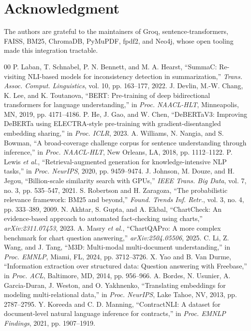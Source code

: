 \documentclass[conference]{IEEEtran}
\begin{document}
\section*{Acknowledgment}
The authors are grateful to the maintainers of Groq, sentence-transformers, FAISS, BM25, ChromaDB, PyMuPDF, fpdf2, and Neo4j, whose open tooling made this integration tractable.
\begin{thebibliography}{00}
P. Laban, T. Schnabel, P. N. Bennett, and M. A. Hearst, ``SummaC: Re-visiting NLI-based models for inconsistency detection in summarization,'' \textit{Trans. Assoc. Comput. Linguistics}, vol. 10, pp. 163--177, 2022.
J. Devlin, M.-W. Chang, K. Lee, and K. Toutanova, ``BERT: Pre-training of deep bidirectional transformers for language understanding,'' in \textit{Proc. NAACL-HLT}, Minneapolis, MN, 2019, pp. 4171--4186.
P. He, J. Gao, and W. Chen, ``DeBERTaV3: Improving DeBERTa using ELECTRA-style pre-training with gradient-disentangled embedding sharing,'' in \textit{Proc. ICLR}, 2023.
A. Williams, N. Nangia, and S. Bowman, ``A broad-coverage challenge corpus for sentence understanding through inference,'' in \textit{Proc. NAACL-HLT}, New Orleans, LA, 2018, pp. 1112--1122.
P. Lewis \textit{et al.}, ``Retrieval-augmented generation for knowledge-intensive NLP tasks,'' in \textit{Proc. NeurIPS}, 2020, pp. 9459--9474.
J. Johnson, M. Douze, and H. Jegou, ``Billion-scale similarity search with GPUs,'' \textit{IEEE Trans. Big Data}, vol. 7, no. 3, pp. 535--547, 2021.
S. Robertson and H. Zaragoza, ``The probabilistic relevance framework: BM25 and beyond,'' \textit{Found. Trends Inf. Retr.}, vol. 3, no. 4, pp. 333--389, 2009.
N. Akhtar, S. Gupta, and A. Ekbal, ``ChartCheck: An evidence-based approach to automated fact-checking using charts,'' \textit{arXiv:2311.07453}, 2023.
A. Masry \textit{et al.}, ``ChartQAPro: A more complex benchmark for chart question answering,'' \textit{arXiv:2504.05506}, 2025.
C. Li, Z. Wang, and J. Tang, ``M3D: Multi-modal multi-document understanding,'' in \textit{Proc. EMNLP}, Miami, FL, 2024, pp. 3712--3726.
X. Yao and B. Van Durme, ``Information extraction over structured data: Question answering with Freebase,'' in \textit{Proc. ACL}, Baltimore, MD, 2014, pp. 956--966.
A. Bordes, N. Usunier, A. Garcia-Duran, J. Weston, and O. Yakhnenko, ``Translating embeddings for modeling multi-relational data,'' in \textit{Proc. NeurIPS}, Lake Tahoe, NV, 2013, pp. 2787--2795.
Y. Koreeda and C. D. Manning, ``ContractNLI: A dataset for document-level natural language inference for contracts,'' in \textit{Proc. EMNLP Findings}, 2021, pp. 1907--1919.
\end{thebibliography}
\end{document}
